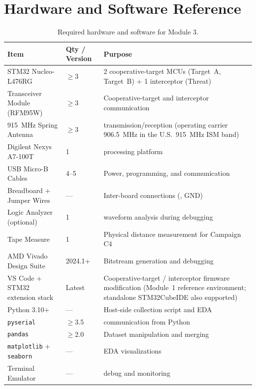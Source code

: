 \documentclass[11pt,letterpaper]{article}
\begin{document}
	\section{Hardware and Software Reference}
	\label{sec:hw_sw}

	\begin{table}[ht!]
		\centering
		\caption{Required hardware and software for Module 3.}
		\label{tab:hw_sw}
		\renewcommand{\arraystretch}{1.3}
		\begin{tabularx}{\textwidth}{l l X}
			\toprule
			\textbf{Item} & \textbf{Qty / Version} & \textbf{Purpose} \\
			\midrule
			STM32 Nucleo-L476RG & $\geq 3$ & 2 cooperative-target MCUs (Target~A, Target~B) + 1 interceptor (Threat) \MCU{} \\
			\RF{} Transceiver Module (RFM95W) & $\geq 3$ & Cooperative-target and interceptor \RF{} communication \\
			915~MHz Spring Antenna & $\geq 3$ & \RF{} transmission/reception (operating carrier 906.5~MHz in the U.S.\ 915~MHz ISM band) \\
			Digilent Nexys A7-100T & 1 & \FPGA{} processing platform \\
			USB Micro-B Cables & 4--5 & Power, programming, and \UART{} communication \\
			Breadboard + Jumper Wires & --- & Inter-board connections (\UART{}, GND) \\
			Logic Analyzer (optional) & 1 & \UART{} waveform analysis during debugging \\
			Tape Measure & 1 & Physical distance measurement for Campaign C4 \\
			\midrule
			AMD Vivado Design Suite & 2024.1+ & Bitstream generation and \ILA{} debugging \\
			VS Code + STM32 extension stack & Latest & Cooperative-target / interceptor firmware modification (Module~1 reference environment; standalone STM32CubeIDE also supported) \\
			Python 3.10+ & --- & Host-side collection script and EDA \\
			\texttt{pyserial} & $\geq$3.5 & \UART{} communication from Python \\
			\texttt{pandas} & $\geq$2.0 & Dataset manipulation and merging \\
			\texttt{matplotlib} + \texttt{seaborn} & --- & EDA visualizations \\
			Terminal Emulator & --- & \UART{} debug and monitoring \\
			\bottomrule
		\end{tabularx}
	\end{table}
\end{document}
